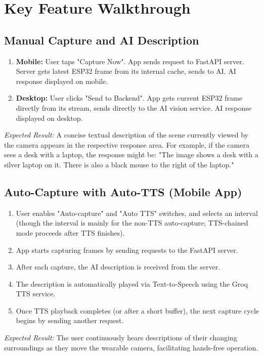 \documentclass[12pt, a4paper]{report}
\begin{document}
\section{Key Feature Walkthrough}
\subsection{Manual Capture and AI Description}
\begin{enumerate}
    \item \textbf{Mobile:} User taps "Capture Now". App sends request to FastAPI server. Server gets latest ESP32 frame from its internal cache, sends to AI. AI response displayed on mobile.
    \item \textbf{Desktop:} User clicks "Send to Backend". App gets current ESP32 frame directly from its stream, sends directly to the AI vision service. AI response displayed on desktop.
\end{enumerate}
\textit{Expected Result:} A concise textual description of the scene currently viewed by the camera appears in the respective response area. For example, if the camera sees a desk with a laptop, the response might be: "The image shows a desk with a silver laptop on it. There is also a black mouse to the right of the laptop."

\subsection{Auto-Capture with Auto-TTS (Mobile App)}
\begin{enumerate}
    \item User enables "Auto-capture" and "Auto TTS" switches, and selects an interval (though the interval is mainly for the non-TTS auto-capture; TTS-chained mode proceeds after TTS finishes).
    \item App starts capturing frames by sending requests to the FastAPI server.
    \item After each capture, the AI description is received from the server.
    \item The description is automatically played via Text-to-Speech using the Groq TTS service.
    \item Once TTS playback completes (or after a short buffer), the next capture cycle begins by sending another request.
\end{enumerate}
\textit{Expected Result:} The user continuously hears descriptions of their changing surroundings as they move the wearable camera, facilitating hands-free operation.
\end{document}
